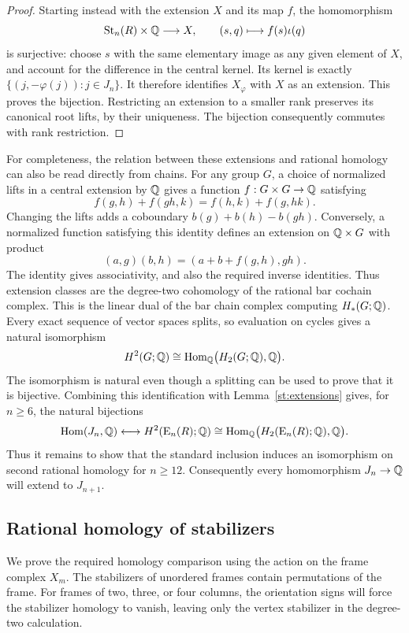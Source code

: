 \begin{proof}
Starting instead with the extension $X$ and its map $f$, the
homomorphism
\[
 \operatorname{St}_n(R)\times\mathbb Q\longrightarrow X,\qquad
 (s,q)\longmapsto f(s)\iota(q)
\]
is surjective: choose $s$ with the same elementary image as
any given element of $X$, and account for the difference in
the central kernel. Its kernel is exactly
$\{(j,-\varphi(j)):j\in J_n\}$. It therefore identifies
$X_\varphi$ with $X$ as an extension. This proves the
bijection. Restricting an extension to a smaller rank
preserves its canonical root lifts, by their uniqueness.
The bijection consequently commutes with rank restriction.
\end{proof}

For completeness, the relation between these extensions and
rational homology can also be read directly from chains. For any
group $G$, a choice of normalized lifts in a central extension
by $\mathbb Q$ gives a function $f:G\times G\to\mathbb Q$ satisfying
\[
 f(g,h)+f(gh,k)=f(h,k)+f(g,hk).
\]
Changing the lifts adds a coboundary
$b(g)+b(h)-b(gh)$. Conversely, a normalized function satisfying
this identity defines an extension on $\mathbb Q\times G$ with
product
\[
 (a,g)(b,h)=(a+b+f(g,h),gh).
\]
The identity gives associativity, and also the required inverse
identities. Thus extension classes are the degree-two
cohomology of the rational bar cochain complex. This is the
linear dual of the bar chain complex computing $H_*(G;\mathbb Q)$.
Every exact sequence of vector spaces splits, so evaluation
on cycles gives a natural isomorphism
\[
 H^2(G;\mathbb Q)\cong
 \operatorname{Hom}_{\mathbb Q}\bigl(H_2(G;\mathbb Q),\mathbb Q\bigr).
\]
The isomorphism is natural even though a splitting can be used
to prove that it is bijective. Combining this identification with
Lemma~\ref{st:extensions} gives, for $n\geq6$, the natural bijections
\[
 \operatorname{Hom}(J_n,\mathbb Q)\longleftrightarrow H^2(\operatorname{E}_n(R);\mathbb Q)
 \cong\operatorname{Hom}_{\mathbb Q}\bigl(H_2(\operatorname{E}_n(R);\mathbb Q),\mathbb Q\bigr).
\]
Thus it remains to show that the standard inclusion induces an
isomorphism on second rational homology for $n\geq12$. Consequently
every homomorphism $J_n\to\mathbb Q$ will extend to $J_{n+1}$.

\subsection{Rational homology of stabilizers}

We prove the required homology comparison using the action on the frame
complex $X_m$.
The stabilizers of unordered frames contain permutations of the frame.
For frames of two, three, or four columns, the orientation signs will
force the stabilizer homology to vanish, leaving only the vertex
stabilizer in the degree-two calculation.

